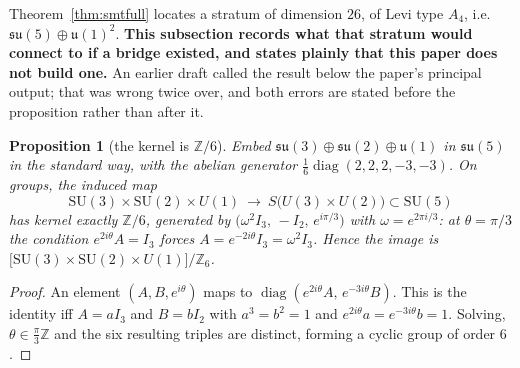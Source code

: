 \documentclass[11pt,reqno]{amsart}
\theoremstyle{plain}
\newtheorem{proposition}[theorem]{Proposition}
\theoremstyle{definition}
\theoremstyle{remark}
\newcommand{\Z}{\mathbb{Z}}
\newcommand{\SU}{\mathrm{SU}}
\newcommand{\su}{\mathfrak{su}}
\newcommand{\uu}{\mathfrak{u}}
\begin{document}
Theorem~\ref{thm:smtfull} locates a stratum of dimension $26$, of Levi type $A_4$, i.e.\
$\su(5)\oplus\uu(1)^2$. \textbf{This subsection records what that stratum would connect
to if a bridge existed, and states plainly that this paper does not build one.} An
earlier draft called the result below the paper's principal output; that was wrong twice
over, and both errors are stated before the proposition rather than after it.

\begin{proposition}[the kernel is $\Z/6$]\label{prop:z6}
Embed $\su(3)\oplus\su(2)\oplus\uu(1)$ in $\su(5)$ in the standard way, with the abelian
generator $\tfrac16\operatorname{diag}(2,2,2,-3,-3)$. On groups, the induced map
\[
   \SU(3)\times\SU(2)\times U(1)\ \longrightarrow\ S\bigl(U(3)\times U(2)\bigr)\subset\SU(5)
\]
has kernel exactly $\Z/6$, generated by
$\bigl(\omega^2 I_3,\,-I_2,\,e^{i\pi/3}\bigr)$ with $\omega=e^{2\pi i/3}$: at
$\theta=\pi/3$ the condition $e^{2i\theta}A=I_3$ forces $A=e^{-2i\theta}I_3=\omega^2I_3$. Hence the image
is $\bigl[\SU(3)\times\SU(2)\times U(1)\bigr]/\Z_6$.
\end{proposition}

\begin{proof}
An element $(A,B,e^{i\theta})$ maps to $\operatorname{diag}(e^{2i\theta}A,\,e^{-3i\theta}B)$.
This is the identity iff $A=aI_3$ and $B=bI_2$ with $a^3=b^2=1$ and
$e^{2i\theta}a=e^{-3i\theta}b=1$. Solving, $\theta\in\tfrac{\pi}{3}\Z$ and the six
resulting triples are distinct, forming a cyclic group of order $6$.
\end{proof}
\end{document}

